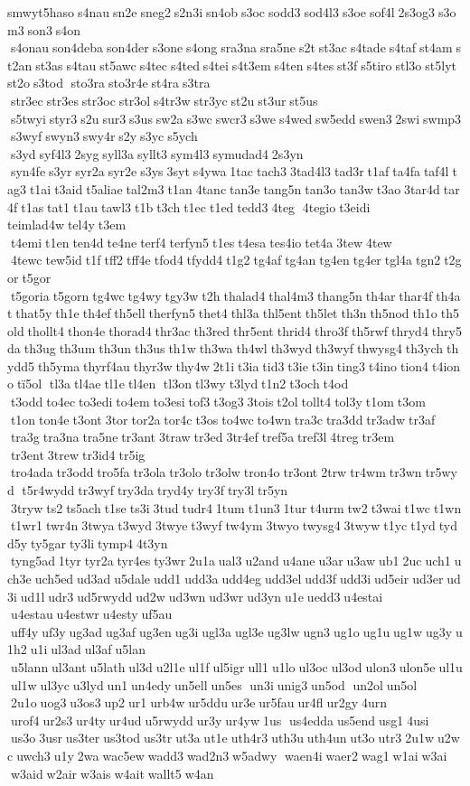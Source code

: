smwyt5haso s4nau sn2e sneg2 s2n3i sn4ob s3oc sodd3 sod4l3 s3oe sof4l 2s3og3 s3om3 son3 s4on  s4onau son4deba son4der s3one s4ong sra3na sra5ne s2t st3ac s4tade s4taf st4am st2an st3as s4tau st5awc s4tec s4ted s4tei s4t3em s4ten s4tes st3f s5tiro stl3o st5lyt st2o s3tod  sto3ra sto3r4e st4ra s3tra  str3ec str3es str3oc str3ol s4tr3w str3yc st2u st3ur st5us  s5twyi styr3 s2u sur3 s3us sw2a s3wc swcr3 s3we s4wed sw5edd swen3 2swi swmp3 s3wyf swyn3 swy4r s2y s3yc s5ych  s3yd syf4l3 2syg syll3a syllt3 sym4l3 symudad4 2s3yn  syn4fe s3yr syr2a syr2e s3ys 3syt s4ywa 1tac tach3 3tad4l3 tad3r t1af ta4fa taf4l tag3 t1ai t3aid t5aliae tal2m3 t1an 4tanc tan3e tang5n tan3o tan3w t3ao 3tar4d tar4f t1as tat1 t1au tawl3 t1b t3ch t1ec t1ed tedd3 4teg  4tegio t3eidi 	teimlad4w tel4y t3em  t4emi t1en ten4d te4ne terf4 terfyn5 t1es t4esa tes4io tet4a 3tew 4tew  4tewc tew5id t1f tff2 tff4e tfod4 tfydd4 t1g2 tg4af tg4an tg4en tg4er tgl4a tgn2 t2gor t5gor  t5goria t5gorn tg4wc tg4wy tgy3w t2h thalad4 thal4m3 thang5n th4ar thar4f th4at that5y th1e th4ef th5ell therfyn5 thet4 thl3a thl5ent th5let th3n th5nod th1o th5old thollt4 thon4e thorad4 thr3ac th3red thr5ent thrid4 thro3f th5rwf thryd4 thry5da th3ug th3um th3un th3us th1w th3wa th4wl th3wyd th3wyf thwysg4 th3ych thydd5 th5yma thyrf4au thyr3w thy4w 2t1i t3ia tid3 t3ie t3in ting3 t4ino tion4 t4iono tï5ol  tl3a tl4ae tl1e tl4en  tl3on tl3wy t3lyd t1n2 t3och t4od  t3odd to4ec to3edi to4em to3esi tof3 t3og3 3tois t2ol tollt4 tol3y t1om t3om  t1on ton4e t3ont 3tor tor2a tor4c t3os to4wc to4wn tra3c tra3dd tr3adw tr3af  tra3g tra3na tra5ne tr3ant 3traw tr3ed 3tr4ef tref5a tref3l 4treg tr3em  tr3ent 3trew tr3id4 tr5ig  tro4ada tr3odd tro5fa tr3ola tr3olo tr3olw tron4o tr3ont 2trw tr4wm tr3wn tr5wyd  t5r4wydd tr3wyf try3da tryd4y try3f try3l tr5yn  3tryw ts2 ts5ach t1se ts3i 3tud tudr4 1tum t1un3 1tur t4urm tw2 t3wai t1wc t1wn t1wr1 twr4n 3twya t3wyd 3twye t3wyf tw4ym 3twyo twysg4 3twyw t1yc t1yd tydd5y ty5gar ty3li tymp4 4t3yn  tyng5ad 1tyr tyr2a tyr4es ty3wr 2u1a ual3 u2and u4ane u3ar u3aw ub1 2uc uch1 uch3e uch5ed ud3ad u5dale udd1 udd3a udd4eg udd3el udd3f udd3i ud5eir ud3er ud3i ud1l udr3 ud5rwydd ud2w ud3wn ud3wr ud3yn u1e uedd3 u4estai  u4estau u4estwr u4esty uf5au  uff4y uf3y ug3ad ug3af ug3en ug3i ugl3a ugl3e ug3lw ugn3 ug1o ug1u ug1w ug3y u1h2 u1i ul3ad ul3af u5lan  u5lann ul3ant u5lath ul3d u2l1e ul1f ul5igr ull1 u1lo ul3oc ul3od ulon3 ulon5e ul1u ul1w ul3yc u3lyd un1 un4edy un5ell un5es  un3i unig3 un5od  un2ol un5ol  2u1o uog3 u3os3 up2 ur1 urb4w ur5ddu ur3e ur5fau ur4fl ur2gy 4urn  urof4 ur2s3 ur4ty ur4ud u5rwydd ur3y ur4yw 1us  us4edda us5end usg1 4usi  us3o 3usr us3ter us3tod us3tr ut3a ut1e uth4r3 uth3u uth4un ut3o utr3 2u1w u2wc uwch3 u1y 2wa wac5ew wadd3 wad2n3 w5adwy  waen4i waer2 wag1 w1ai w3ai  w3aid w2air w3ais w4ait wallt5 w4an 